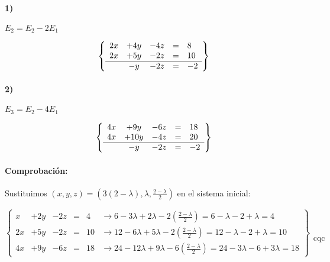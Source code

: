 \documentclass[palatino,nosec,nochap]{Docencia}
\begin{document}
\begin{problem}
\paragraph{1)} $E_2=E_2-2E_1$

\[
\left\{\begin{array}{lcccl}
2x&+4y&-4z&=&8\\
2x&+5y&-2z&=&10\\
\hline
&-y&-2z&=&-2 
\end{array}\right\}
\]

\paragraph{2)} $E_3=E_2-4E_1$

\[
\left\{\begin{array}{lcccl}
4x&+9y&-6z&=&18\\
4x&+10y&-4z&=&20\\
\hline
&-y&-2z&=&-2 
\end{array}\right\}
\]


\paragraph*{Comprobación:} Sustituimos $(x,y,z) = \left(3(2-λ),λ,\frac{2-λ}{2}\right)$ en el sistema inicial:


\[
\left\{\begin{array}{lcccll}
x&+2y&-2z&=&4 &\to 6-3λ + 2λ - 2\displaystyle\left(\frac{2-λ}{2}\right) = 6-λ-2+λ = 4\\
2x&+5y&-2z&=&10 &\to 12-6λ +5λ - 2\displaystyle\left(\frac{2-λ}{2}\right) = 12-λ-2+λ = 10\\
4x&+9y&-6z&=&18 &\to 24-12λ + 9λ - 6\displaystyle\left(\frac{2-λ}{2}\right) = 24-3λ-6+3λ = 18
\end{array}\right\}\begin{array}{c}\\\\\\\\\text{cqc}\end{array}
\]

\end{problem}
\end{document}
